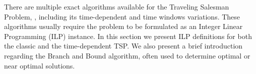 There are multiple exact algorithms available for the Traveling Salesman Problem, \cite{tsp_exact_review}, including its time-dependent \cite{tdtwptw_exact} and time windows \cite{tsptw_exact_soloman} variations. These algorithms usually require the problem to be formulated as an Integer Linear Programming (ILP) instance. In this section we present ILP definitions for both the classic and the time-dependent TSP. We also present a brief introduction regarding the Branch and Bound algorithm, often used to determine optimal or near optimal solutions.



